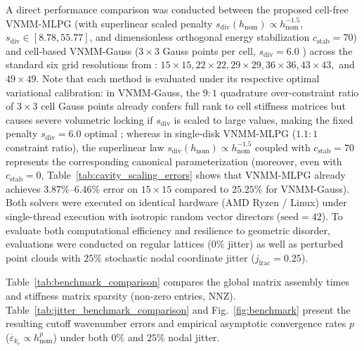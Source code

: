 \documentclass[preprint,12pt]{elsarticle}
\begin{document}
A direct performance comparison was conducted between the proposed cell-free VNMM-MLPG (with superlinear scaled penalty $s_{\mathrm{div}}(h_{\mathrm{nom}}) \propto h_{\mathrm{nom}}^{-1.5}$, $s_{\mathrm{div}} \in [8.78, 55.77]$, and dimensionless orthogonal energy stabilization $c_{\mathrm{stab}} = 70$) and cell-based VNMM-Gauss ($3 \times 3$ Gauss points per cell, $s_{\mathrm{div}} = 6.0$ \cite{stable_vnmm2d_2026}) across the standard six grid resolutions from \cite{stable_vnmm2d_2026}: $15 \times 15, 22 \times 22, 29 \times 29, 36 \times 36, 43 \times 43,$ and $49 \times 49$. Note that each method is evaluated under its respective optimal variational calibration: in VNMM-Gauss, the $9:1$ quadrature over-constraint ratio of $3\times 3$ cell Gauss points already confers full rank to cell stiffness matrices but causes severe volumetric locking if $s_{\mathrm{div}}$ is scaled to large values, making the fixed penalty $s_{\mathrm{div}} = 6.0$ optimal \cite{stable_vnmm2d_2026}; whereas in single-disk VNMM-MLPG ($1.1:1$ constraint ratio), the superlinear law $s_{\mathrm{div}}(h_{\mathrm{nom}}) \propto h_{\mathrm{nom}}^{-1.5}$ coupled with $c_{\mathrm{stab}} = 70$ represents the corresponding canonical parameterization (moreover, even with $c_{\mathrm{stab}} = 0$, Table~\ref{tab:cavity_scaling_errors} shows that VNMM-MLPG already achieves $3.87\%\text{--}6.46\%$ error on $15\times 15$ compared to $25.25\%$ for VNMM-Gauss). Both solvers were executed on identical hardware (AMD Ryzen / Linux) under single-thread execution with isotropic random vector directors ($\text{seed}=42$). To evaluate both computational efficiency and resilience to geometric disorder, evaluations were conducted on regular lattices ($0\%$ jitter) as well as perturbed point clouds with $25\%$ stochastic nodal coordinate jitter ($j_{\mathrm{frac}} = 0.25$).

Table~\ref{tab:benchmark_comparison} compares the global matrix assembly times and stiffness matrix sparsity (non-zero entries, NNZ). Table~\ref{tab:jitter_benchmark_comparison} and Fig.~\ref{fig:benchmark} present the resulting cutoff wavenumber errors and empirical asymptotic convergence rates $p$ ($\overline{\varepsilon}_{k_c} \propto h_{\mathrm{nom}}^p$) under both $0\%$ and $25\%$ nodal jitter.
\end{document}
